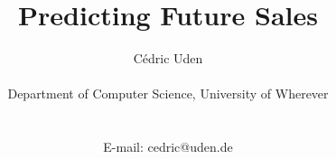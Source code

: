 
\title{Predicting Future Sales}



\author
{Cédric Uden\\
\\
\normalsize{Department of Computer Science, University of Wherever}\\
\\

\\
\normalsize{E-mail: cedric@uden.de}
}


\date{}
